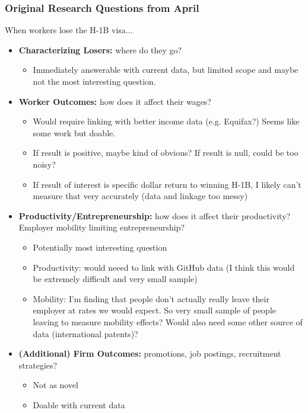 \documentclass[xcolor=dvipsnames, compress, 12pt, aspectratio=169, handout]{beamer}
\begin{document}
\begin{frame}[allowframebreaks]
    \frametitle{Original Research Questions from April}
    When workers lose the H-1B visa...
    \vspace{2mm}
    \begin{itemize}
        \item \textbf{Characterizing Losers:} where do they go? 
        \begin{itemize}
            \item Immediately answerable with current data, but limited scope and maybe not the most interesting question. 
        \end{itemize}
        \vspace{4mm}
        \item \textbf{Worker Outcomes:} how does it affect their wages?
        \begin{itemize}
            \item Would require linking with better income data (e.g. Equifax?) Seems like some work but doable.
            \item If result is positive, maybe kind of obvious? If result is null, could be too noisy?
            \item If result of interest is specific dollar return to winning H-1B, I likely can't measure that very accurately (data and linkage too messy)
        \end{itemize}
        \vspace{7mm}
        \item \textbf{Productivity/Entrepreneurship:} how does it affect their productivity? Employer mobility limiting entrepreneurship?
        \begin{itemize}
            \item Potentially most interesting question
            \item Productivity: would neeed to link with GitHub data (I think this would be extremely difficult and very small sample)
            \item Mobility: I'm finding that people don't actually really leave their employer at rates we would expect. So very small sample of people leaving to measure mobility effects? Would also need some other source of data (international patents)?
        \end{itemize}
        \item \textbf{(Additional) Firm Outcomes:} promotions, job postings, recruitment strategies? 
        \begin{itemize}
            \item Not as novel 
            \item Doable with current data 
        \end{itemize}
    \end{itemize}
\end{frame}
\end{document}

